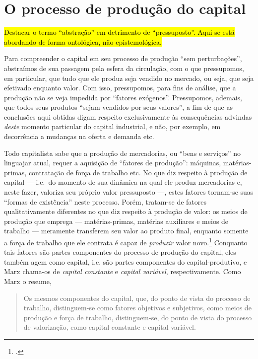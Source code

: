 \section{O processo de produção do capital}
\hl{Destacar o termo ``abstração'' em detrimento de ``pressuposto''. Aqui se está abordando de forma ontológica, não epistemológica.}

Para compreender o capital em seu processo de produção ``sem perturbações'', abstraímos de sua passagem pela esfera da circulação, com o que pressupomos, em particular, que tudo que ele produz seja vendido no mercado, ou seja, que seja efetivado enquanto valor. Com isso, pressupomos, para fins de análise, que a produção não se veja impedida por ``fatores exógenos''. Pressupomos, ademais, que todos seus produtos ``sejam vendidos por seus valores'', a fim de que as conclusões aqui obtidas digam respeito exclusivamente às consequências advindas \emph{deste} momento particular do capital industrial, e não, por exemplo, em decorrência a mudanças na oferta e demanda etc.

Todo capitalista sabe que a produção de mercadorias, ou ``bens e serviços'' no linguajar atual, requer a aquisição de ``fatores de produção'': máquinas, matérias-primas, contratação de força de trabalho etc. No que diz respeito à produção de capital --- i.e.~do momento de sua dinâmica na qual ele produz mercadorias e, neste fazer, valoriza seu próprio valor pressuposto ---, estes fatores tornam-se suas ``formas de existência'' neste processo. Porém, tratam-se de fatores qualitativamente diferentes no que diz respeito à produção de valor: os meios de produção que emprega --- matérias-primas, matérias auxiliares e meios de trabalho --- meramente transferem seu valor ao produto final, enquanto somente a força de trabalho que ele contrata é capaz de \emph{produzir} valor novo.\footcite[pp. 277-88]{Marx2017} Conquanto tais fatores são partes componentes do processo de produção do capital, eles também agem como capital, i.e. são partes componentes do capital-produtivo, e Marx chama-os de \emph{capital constante} e \emph{capital variável}, respectivamente. %
Como Marx o resume,
\begin{quote}
    Os mesmos componentes do capital, que, do ponto de vista do processo de trabalho, distinguem-se como fatores objetivos e subjetivos, como meios de produção e força de trabalho, distinguem-se, do ponto de vista do processo de valorização, como capital constante e capital variável. \parencite[p. 286]{Marx2017}
\end{quote}


